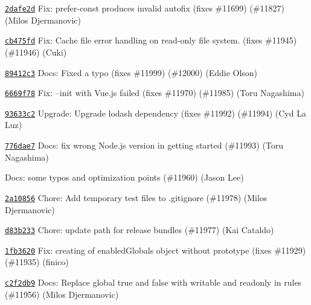 \begin{DoxyItemize}
\item \href{https://github.com/eslint/eslint/commit/2dafe2d288d1e0d353bb938d12a5da888091cfdb}{\texttt{ {\ttfamily 2dafe2d}}} Fix\+: prefer-\/const produces invalid autofix (fixes \#11699) (\#11827) (Milos Djermanovic)
\item \href{https://github.com/eslint/eslint/commit/cb475fd8c0bbfcb00340459966b6780f39ea87a7}{\texttt{ {\ttfamily cb475fd}}} Fix\+: Cache file error handling on read-\/only file system. (fixes \#11945) (\#11946) (Cuki)
\item \href{https://github.com/eslint/eslint/commit/89412c3cbc52e556dba590fa94e10bf40faf1fdf}{\texttt{ {\ttfamily 89412c3}}} Docs\+: Fixed a typo (fixes \#11999) (\#12000) (Eddie Olson)
\item \href{https://github.com/eslint/eslint/commit/6669f78a3dd305aef6191e7eea24fae2ae4fd2e8}{\texttt{ {\ttfamily 6669f78}}} Fix\+: --init with Vue.\+js failed (fixes \#11970) (\#11985) (Toru Nagashima)
\item \href{https://github.com/eslint/eslint/commit/93633c2b3716b17816bcb3dc221c49b75db41317}{\texttt{ {\ttfamily 93633c2}}} Upgrade\+: Upgrade lodash dependency (fixes \#11992) (\#11994) (Cyd La Luz)
\item \href{https://github.com/eslint/eslint/commit/776dae71f2f5c7b5f0650ea3c277eca26e324e41}{\texttt{ {\ttfamily 776dae7}}} Docs\+: fix wrong Node.\+js version in getting started (\#11993) (Toru Nagashima)
\item \href{https://github.com/eslint/eslint/commit/4448261f5d217d8a06eb0ef898401928b54a34e3}{\texttt{ {}}} Docs\+: some typos and optimization points (\#11960) (Jason Lee)
\item \href{https://github.com/eslint/eslint/commit/2a10856d1ed5880a09a5ba452bd80d49c1be4e6c}{\texttt{ {\ttfamily 2a10856}}} Chore\+: Add temporary test files to .gitignore (\#11978) (Milos Djermanovic)
\item \href{https://github.com/eslint/eslint/commit/d83b23382de3b80056a7e6330ed5846316c94147}{\texttt{ {\ttfamily d83b233}}} Chore\+: update path for release bundles (\#11977) (Kai Cataldo)
\item \href{https://github.com/eslint/eslint/commit/1fb362093a65b99456a11029967d9ee0c31fd697}{\texttt{ {\ttfamily 1fb3620}}} Fix\+: creating of enabled\+Globals object without prototype (fixes \#11929) (\#11935) (finico)
\item \href{https://github.com/eslint/eslint/commit/c2f2db97c6d6a415b78ee7b3e8924853d465e757}{\texttt{ {\ttfamily c2f2db9}}} Docs\+: Replace global true and false with writable and readonly in rules (\#11956) (Milos Djermanovic)

\end{DoxyItemize}
